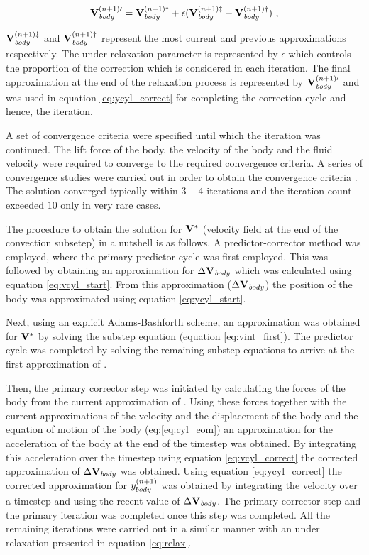  \begin{equation} \centering
 \label{eq:relax}
 \Vcyl^{(n+1)\prime} = \Vcyl^{(n+1)\dag} + \epsilon(\Vcyl^{(n+1)\ddag} - \Vcyl^{(n+1)\dag}) ~,
 \end{equation}
 
 $\mathbf{V}_{\mathit{body}}^{(n+1)\ddag}$ and $\mathbf{V}_{\mathit{body}}^{(n+1)\dag}$ represent the most current and previous approximations respectively. The under relaxation parameter is represented by $\epsilon$ which controls the proportion of the correction which is considered in each iteration. The final approximation at the end of the relaxation process is represented by $\mathbf{V}_{\mathit{body}}^{(n+1)\prime}$ and was used in equation \ref{eq:ycyl_correct} for completing the correction cycle and hence, the iteration.
 
  A set of convergence criteria were specified until which the iteration was continued. The lift force of the body, the velocity of the body and the fluid velocity were required to converge to the required convergence criteria. A series of convergence studies were carried out in order to obtain the convergence criteria \citep{Pregnalato:thesis}. The solution converged typically within $3-4$ iterations and the iteration count exceeded $10$ only in very rare cases.  
  
  The procedure to obtain the solution for $\mathbf{V}^{*}$ (velocity field at the end of the convection subsetep) in a nutshell is as follows. A predictor-corrector method was employed, where the primary predictor cycle was first employed. This was followed by obtaining an approximation for $\Delta\mathbf{V}_{\mathit{body}}$ which was calculated using equation \ref{eq:vcyl_start}. From this approximation ($\Delta\mathbf{V}_{\mathit{body}}$)  the position of the body was approximated using equation \ref{eq:ycyl_start}.
 
 Next, using an explicit Adams-Bashforth scheme, an approximation was obtained for $\mathbf{V}^{*}$ by solving the substep equation (equation \ref{eq:vint_first}). The predictor cycle was completed by solving the remaining substep equations to arrive at the first approximation of \Vnext.   
 
 Then, the primary corrector step was initiated by calculating the forces of the body from the current approximation of \Vnext. Using these forces together with the current approximations of the velocity and the displacement of the body and the equation of motion of the body (eq:\ref{eq:cyl_eom}) an approximation for the acceleration of the body at the end of the timestep was obtained. By integrating this acceleration over the timestep using equation \ref{eq:vcyl_correct} the corrected approximation of $\Delta\mathbf{V}_{\mathit{body}}$ was obtained. Using equation \ref{eq:ycyl_correct} the corrected approximation for $y_{body}^{(n+1)}$  was obtained by integrating the velocity over a timestep and using the recent value of $\Delta\mathbf{V}_{\mathit{body}}$. The primary corrector step and the primary iteration was completed once this step was completed. All the remaining iterations were carried out in a similar manner with an under relaxation presented in equation \ref{eq:relax}. 
 
